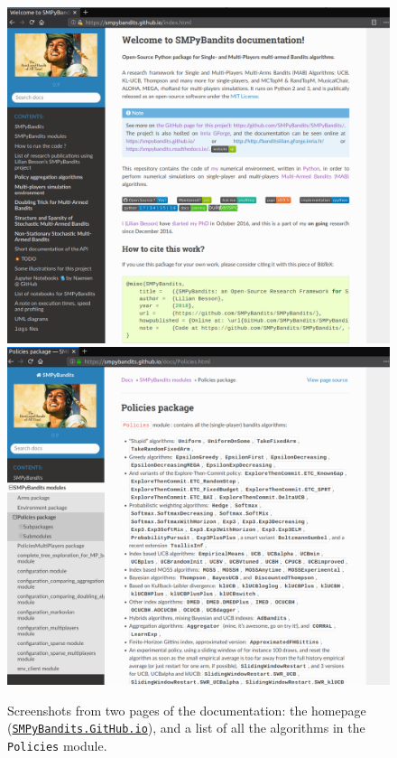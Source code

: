 \vfill{}

\begin{figure}[h!]  %
    \centering
	\includegraphics[width=0.495\linewidth]{overview_documentation_1.png}
    \includegraphics[width=0.495\linewidth]{overview_documentation_2.png}
	\caption{Screenshots from two pages of the documentation: the homepage (\texttt{\href{https://SMPyBandits.GitHub.io}{SMPyBandits.GitHub.io}}), and a list of all the algorithms in the \texttt{Policies} module.}
	\label{fig:3:twoScreenshotsOfTheDocumentation}
\end{figure}

